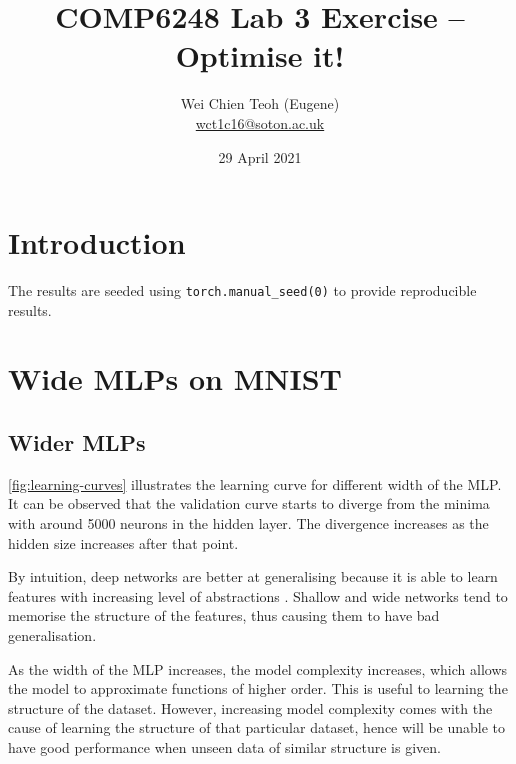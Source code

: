 \documentclass[twocolumn]{article}
\title{\Large COMP6248 Lab 3 Exercise -- Optimise it!}
\author{\small Wei Chien Teoh (Eugene)\\\bigskip \href{mailto:wct1c16@soton.ac.uk}{wct1c16@soton.ac.uk}}
\date{\small 29 April 2021}
\begin{document}
\maketitle

\section*{Introduction}

The results are seeded using \lstinline{torch.manual_seed(0)} to provide reproducible results.

\section{Wide MLPs on MNIST}

\subsection{Wider MLPs}

\cref{fig:learning-curves} illustrates the learning curve for different width of the MLP. It can be observed that the validation curve starts to diverge from the minima with around 5000 neurons in the hidden layer. The divergence increases as the hidden size increases after that point.

By intuition, deep networks are better at generalising because it is able to learn features with increasing level of abstractions \autocite{eldanPowerDepthFeedforward2016}. Shallow and wide networks tend to memorise the structure of the features, thus causing them to have bad generalisation.

As the width of the MLP increases, the model complexity increases, which allows the model to approximate functions of higher order. This is useful to learning the structure of the dataset. However, increasing model complexity comes with the cause of learning the structure of that particular dataset, hence will be unable to have good performance when unseen data of similar structure is given.
\end{document}
